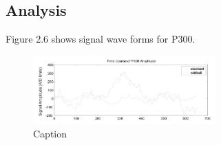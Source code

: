 \subsection{Analysis}
Figure 2.6 shows signal wave forms for P300.
\begin{figure}
    \centering
    \includegraphics[width=70mm]{images/figure-2-6.jpg}
    \caption{Caption}
    \label{fig:my_label}
\end{figure}

